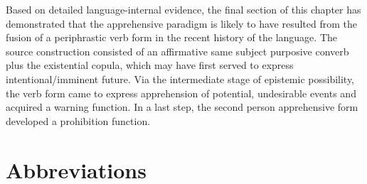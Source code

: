 \documentclass[output=paper,colorlinks,citecolor=brown,
]{langsci/langscibook}
\begin{document}
Based on detailed language-internal evidence, the final section of this chapter has demonstrated that the apprehensive paradigm is likely to have resulted from the fusion of a periphrastic verb form in the recent history of the language. The source construction consisted of an affirmative same subject purposive converb plus the existential copula, which may have first served to express intentional\slash imminent future. Via the intermediate stage of epistemic possibility, the verb form came to express apprehension of potential, undesirable events and acquired a warning function. In a last step, the second person apprehensive form developed a prohibition function.

\section*{Abbreviations}
\end{document}

